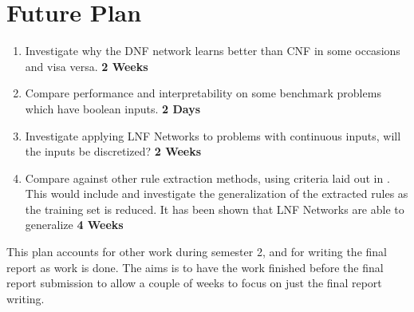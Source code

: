 \chapter{Future Plan}\label{C:futureplan}

\begin{enumerate}
\item Investigate why the DNF network learns better than CNF in some occasions and visa versa. \textbf{2 Weeks}
\item Compare performance and interpretability on some benchmark problems which have boolean inputs. \textbf{2 Days}
\item Investigate applying LNF Networks to problems with continuous inputs, will the inputs be discretized? \textbf{2 Weeks}
\item Compare against other rule extraction methods, using criteria laid out in \cite{andrews1995survey}. This would include  and investigate the generalization of the extracted rules as the training set is reduced. It has been shown that LNF Networks are able to generalize \textbf{4 Weeks}
\end{enumerate}

This plan accounts for other work during semester 2, and for writing the final report as work is done. The aims is to have the work finished before the final report submission to allow a couple of weeks to focus on just the final report writing.